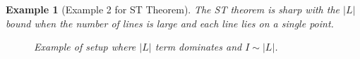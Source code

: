 \documentclass[12pt]{amsart}
\newtheorem{example}[theorem]{Example}
\begin{document}
\begin{example}[Example 2 for ST Theorem]
    The ST theorem is sharp with the $|L|$ bound when the number of lines is large and each line lies on a single point.


\begin{figure}[h]
    \centering
{}
\caption{Example of setup where $|L|$ term dominates and $I \sim |L|$. }
\label{fig:example2st}
\end{figure}
\end{example}
\end{document}
